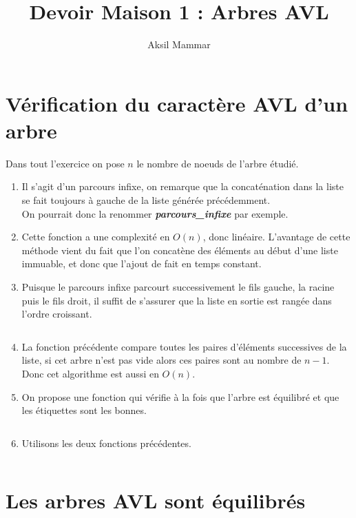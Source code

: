 \documentclass[article,11pt]{article}
\begin{document}
\title{Devoir Maison 1 : Arbres AVL\vspace{-.75em}}
\author{Aksil Mammar}
\date{}
\maketitle

\section{Vérification du caractère AVL d'un arbre}

Dans tout l'exercice on pose $n$ le nombre de noeuds de l'arbre étudié.

\begin{enumerate}
\item Il s'agit d'un parcours infixe, on remarque que la concaténation dans la liste se fait toujours à gauche de la liste générée précédemment.\\
On pourrait donc la renommer \textsl{\textbf{parcours\_infixe}} par exemple.
\item Cette fonction a une complexité en $O(n)$, donc linéaire.
L'avantage de cette méthode vient du fait que l'on concatène des éléments au début d'une liste immuable, et donc que l'ajout de fait en temps constant.
\item Puisque le parcours infixe parcourt successivement le fils gauche, la racine puis le fils droit, il suffit de s'assurer que la liste en sortie est rangée dans l'ordre croissant.
\inputminted[fontsize=\small,firstline=7,lastline=12]{ocaml}{part1.ml}
\item La fonction précédente compare toutes les paires d'éléments successives de la liste, si cet arbre n'est pas vide alors ces paires sont au nombre de $n-1$.
Donc cet algorithme est aussi en $O(n)$.
\item On propose une fonction qui vérifie à la fois que l'arbre est équilibré et que les étiquettes sont les bonnes.
\inputminted[fontsize=\small,firstline=13,lastline=23]{ocaml}{part1.ml}
\item Utilisons les deux fonctions précédentes.
\inputminted[fontsize=\small,firstline=24,lastline=24]{ocaml}{part1.ml}
\end{enumerate}

\section{Les arbres AVL sont équilibrés}
\end{document}
